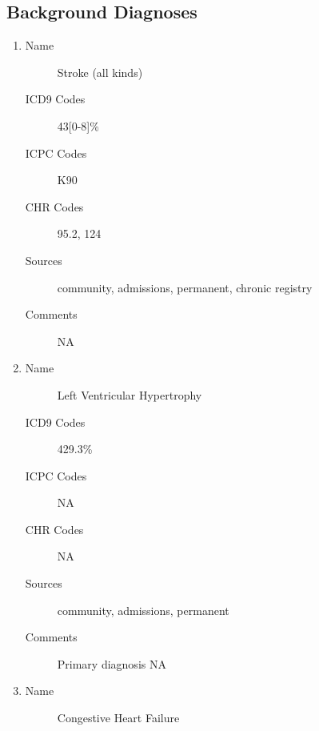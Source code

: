 \documentclass[a4paper,12pt]{article}
\begin{document}
\begin{appendices}
	   		\subsection{Background Diagnoses}
	   			\begin{enumerate}
	   				\item
	   				\begin{description}
	   					\item[Name] Stroke (all kinds)
	   					\item[ICD9 Codes] 43[0-8]\%
	   					\item[ICPC Codes] K90
	   					\item[CHR Codes] 95.2, 124
	   					\item[Sources] community, admissions, permanent, chronic registry
	   					\item[Comments] NA
	   				\end{description}
   					\item
   					\begin{description}
   						\item[Name] Left Ventricular Hypertrophy
   						\item[ICD9 Codes] 429.3\%
   						\item[ICPC Codes] NA
   						\item[CHR Codes] NA
   						\item[Sources] community, admissions, permanent
   						\item[Comments] Primary diagnosis NA
   					\end{description}
   					\item
   					\begin{description}
   						\item[Name] Congestive Heart Failure

\end{description}
\end{enumerate}
\end{appendices}
\end{document}

